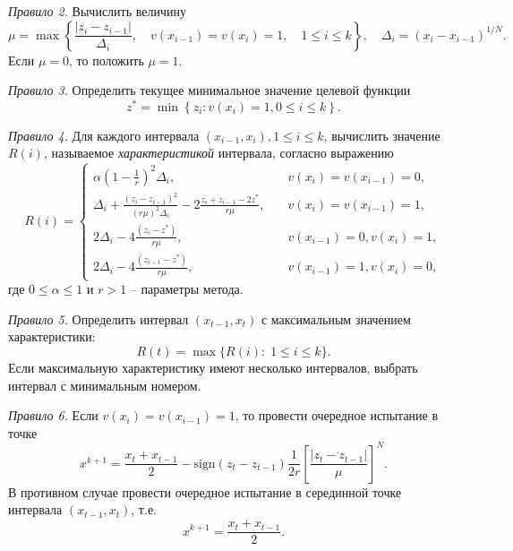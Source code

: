 \documentclass[10pt,a4paper]{book}
\begin{document}
\textit{Правило 2.} Вычислить величину
\begin{equation}\label{eq7} 
\mu = \max\left\{ \frac{|z_i-z_{i-1}|}{\Delta _i},\quad v(x_{i-1})=v(x_i)=1, \quad 1 \leq i \leq k  \right\},\quad \Delta _i= (x_i-x_{i-1})^{1/N}.
\end{equation}
Если $\mu=0$, то положить $\mu=1$.

\textit{Правило 3.} Определить текущее минимальное значение целевой функции
\begin{equation}\label{eq8} 
z^*= \min \left\{ z_i: v(x_i)=1, 0 \leq i \leq k \right\}.
\end{equation}

\textit{Правило 4.} Для каждого интервала $(x_{i-1},x_i),1 \leq i \leq k$, вычислить значение $R(i)$, называемое \textit{характеристикой} интервала, согласно выражению
\begin{equation}\label{eq9} 
R(i)=
  \begin{cases}
    \alpha {(1-\frac{1}{r})}^2 \Delta _i,& {\quad v(x_i)=v(x_{i-1})=0,} \\
    \Delta _i+\frac {{(z_i-z_{i-1})}^2}{{(r \mu)}^2 \Delta _i} - 2 \frac {z_i+z_{i-1}-2z^*}{r \mu}, & {\quad  v(x_i)=v(x_{i-1})=1},\\
    2 \Delta _i-4 \frac {(z_i-z^*)}{r \mu}, & {\quad v(x_{i-1})=0, v(x_i)=1},\\
    2 \Delta _i-4 \frac {(z_{i-1}-z^*)}{r \mu}, & {\quad  v(x_{i-1})=1, v(x_i)=0,}
  \end{cases}
\end{equation}
где $0 \leq \alpha \leq 1$ и $r>1$ -- параметры метода. 

\textit{Правило 5.} Определить интервал $(x_{t-1},x_t)$ с максимальным значением характеристики:
\begin{equation}\label{Rt} 
R(t)= \max\{R(i): \; 1 \leq i \leq k\}.
\end{equation}
Если максимальную характеристику имеют несколько интервалов, выбрать интервал
с минимальным номером.

\textit{Правило 6.} Если $v(x_i)=v(x_{i-1})=1$, то провести очередное испытание в точке 
\begin{equation}\label{eq11} 
x^{k+1}= \frac {x_t+x_{t-1}}{2} -  \text{sign} {(z_t-z_{t-1})} \frac{1}{2r} \left[\frac {{|z_t-z_{t-1}|}}{\mu} \right]^N.
\end{equation}
В противном случае провести очередное испытание в серединной точке интервала $(x_{t-1},x_t)$, т.е.
\begin{equation}\label{eq10} 
x^{k+1}=\frac {x_t+x_{t-1}}{2}.
\end{equation}
\end{document}
